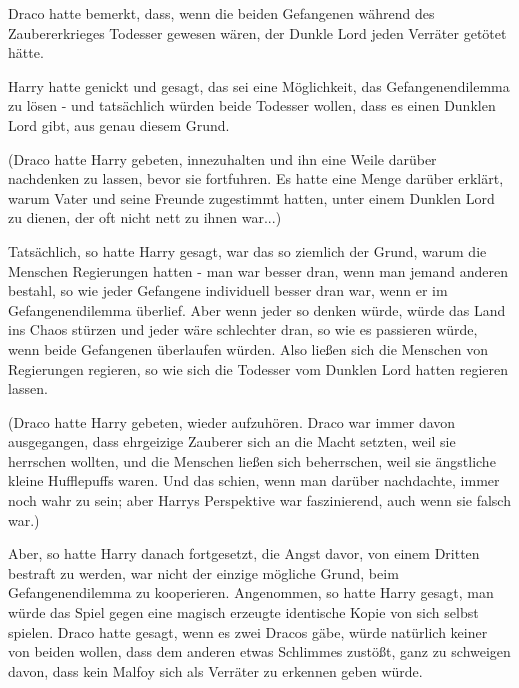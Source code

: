 Draco hatte bemerkt, dass, wenn die beiden Gefangenen während des
Zaubererkrieges Todesser gewesen wären, der Dunkle Lord jeden Verräter getötet
hätte.

Harry hatte genickt und gesagt, das sei eine Möglichkeit, das Gefangenendilemma
zu lösen - und tatsächlich würden beide Todesser wollen, dass es einen Dunklen
Lord gibt, aus genau diesem Grund.

(Draco hatte Harry gebeten, innezuhalten und ihn eine Weile darüber nachdenken
zu lassen, bevor sie fortfuhren. Es hatte eine Menge darüber erklärt, warum
Vater und seine Freunde zugestimmt hatten, unter einem Dunklen Lord zu dienen,
der oft nicht nett zu ihnen war...)

Tatsächlich, so hatte Harry gesagt, war das so ziemlich der Grund, warum die
Menschen Regierungen hatten - man war besser dran, wenn man jemand anderen
bestahl, so wie jeder Gefangene individuell besser dran war, wenn er im
Gefangenendilemma überlief. Aber wenn jeder so denken würde, würde das Land ins
Chaos stürzen und jeder wäre schlechter dran, so wie es passieren würde, wenn
beide Gefangenen überlaufen würden. Also ließen sich die Menschen von
Regierungen regieren, so wie sich die Todesser vom Dunklen Lord hatten regieren
lassen.

(Draco hatte Harry gebeten, wieder aufzuhören. Draco war immer davon
ausgegangen, dass ehrgeizige Zauberer sich an die Macht setzten, weil sie
herrschen wollten, und die Menschen ließen sich beherrschen, weil sie ängstliche
kleine Hufflepuffs waren. Und das schien, wenn man darüber nachdachte, immer
noch wahr zu sein; aber Harrys Perspektive war faszinierend, auch wenn sie
falsch war.)

Aber, so hatte Harry danach fortgesetzt, die Angst davor, von einem Dritten
bestraft zu werden, war nicht der einzige mögliche Grund, beim Gefangenendilemma
zu kooperieren. Angenommen, so hatte Harry gesagt, man würde das Spiel gegen
eine magisch erzeugte identische Kopie von sich selbst spielen. Draco hatte
gesagt, wenn es zwei Dracos gäbe, würde natürlich keiner von beiden wollen, dass
dem anderen etwas Schlimmes zustößt, ganz zu schweigen davon, dass kein Malfoy
sich als Verräter zu erkennen geben würde.

